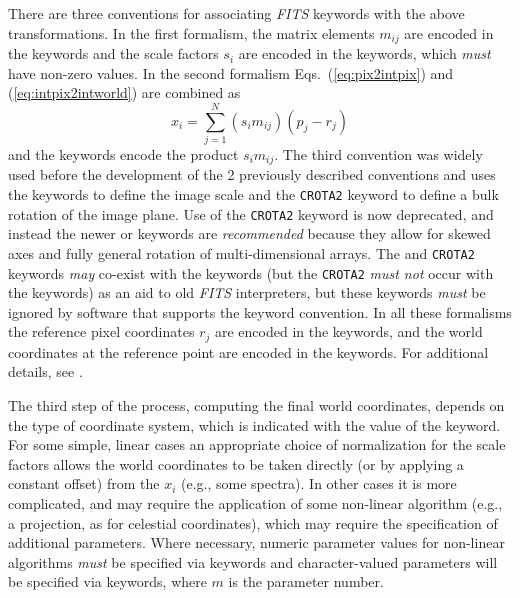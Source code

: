 \documentclass[11pt,makeidx]{book}     %
\begin{document}
There are three conventions for associating {\em FITS\/} keywords with the above
transformations.  
In the first formalism, the matrix
elements $m_{ij}$ are encoded in the  keywords and the scale
factors $s_i$ are encoded in the  keywords, which {\em must}
have non-zero values. In the second formalism Eqs.~(\ref{eq:pix2intpix}) and
(\ref{eq:intpix2intworld}) are combined as  
\begin{equation}
x_i = \sum_{j=1}^{N} (s_i m_{ij}) (p_j - r_j)  \label{eq:pix2intworld}
\end{equation}
and the
 keywords encode the product $s_i m_{ij}$.   
The third convention was widely used before the development
of the 2 previously described conventions and
uses the  keywords to define the image scale and the
{\tt CROTA2} keyword to define a bulk rotation of the image plane.  
Use of the {\tt CROTA2} keyword is now deprecated,  
and instead the newer
 or  keywords are {\em recommended} because they
allow for skewed axes and fully general rotation of multi-dimensional arrays. 
The
 and {\tt CROTA2} keywords {\em may} co-exist with the
 keywords 
(but the {\tt CROTA2} {\em must not} occur with the  keywords)
as an aid to old {\em FITS\/}
interpreters, but these keywords  {\em must} be
ignored by software that supports the  keyword convention.
 In all these formalisms the reference pixel coordinates $r_j$ are encoded in
the  keywords, and the world coordinates at the reference point
are encoded in the  keywords. For additional details, see \cite{greisen02}. 

The third step of the process, computing the final world coordinates, depends on
the type of coordinate system, which is indicated with the value of the
 keyword. For some simple, linear cases an appropriate choice of
normalization for the scale factors allows the world coordinates to be taken
directly (or by applying a constant offset) from the $x_i$ (e.g., some spectra).
In other cases it is more complicated, and may require the application of some
non-linear algorithm (e.g., a projection, as for celestial coordinates), which may
require the specification of additional parameters. Where necessary, numeric
parameter values for non-linear algorithms {\em must} be specified via
 keywords and character-valued parameters will be specified via
 keywords, where $m$ is the parameter number. 
\end{document}
